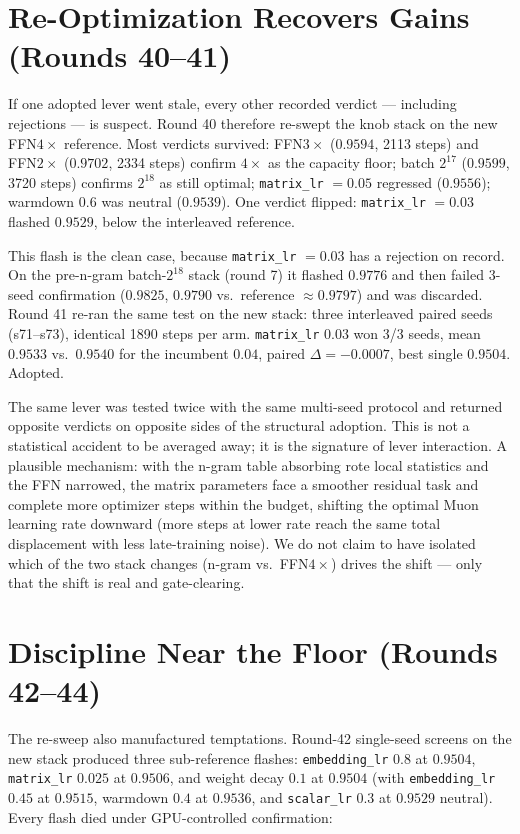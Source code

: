 \documentclass{article}
\begin{document}
\section{Re-Optimization Recovers Gains (Rounds 40--41)}
\label{sec:reopt}

If one adopted lever went stale, every other recorded verdict --- including rejections --- is suspect. Round 40 therefore re-swept the knob stack on the new FFN$4\times$ reference. Most verdicts survived: FFN$3\times$ ($0.9594$, 2113 steps) and FFN$2\times$ ($0.9702$, 2334 steps) confirm $4\times$ as the capacity floor; batch $2^{17}$ ($0.9599$, 3720 steps) confirms $2^{18}$ as still optimal; \texttt{matrix\_lr} $= 0.05$ regressed ($0.9556$); warmdown $0.6$ was neutral ($0.9539$). One verdict flipped: \texttt{matrix\_lr} $= 0.03$ flashed $0.9529$, below the interleaved reference.

This flash is the clean case, because \texttt{matrix\_lr} $= 0.03$ has a rejection on record. On the pre-n-gram batch-$2^{18}$ stack (round 7) it flashed $0.9776$ and then failed 3-seed confirmation ($0.9825$, $0.9790$ vs.\ reference $\approx 0.9797$) and was discarded. Round 41 re-ran the same test on the new stack: three interleaved paired seeds (s71--s73), identical 1890 steps per arm. \texttt{matrix\_lr} $0.03$ won 3/3 seeds, mean $0.9533$ vs.\ $0.9540$ for the incumbent $0.04$, paired $\Delta = -0.0007$, best single $0.9504$. Adopted.

The same lever was tested twice with the same multi-seed protocol and returned opposite verdicts on opposite sides of the structural adoption. This is not a statistical accident to be averaged away; it is the signature of lever interaction. A plausible mechanism: with the n-gram table absorbing rote local statistics and the FFN narrowed, the matrix parameters face a smoother residual task and complete more optimizer steps within the budget, shifting the optimal Muon learning rate downward (more steps at lower rate reach the same total displacement with less late-training noise). We do not claim to have isolated which of the two stack changes (n-gram vs.\ FFN$4\times$) drives the shift --- only that the shift is real and gate-clearing.

\section{Discipline Near the Floor (Rounds 42--44)}
\label{sec:discipline}

The re-sweep also manufactured temptations. Round-42 single-seed screens on the new stack produced three sub-reference flashes: \texttt{embedding\_lr} $0.8$ at $0.9504$, \texttt{matrix\_lr} $0.025$ at $0.9506$, and weight decay $0.1$ at $0.9504$ (with \texttt{embedding\_lr} $0.45$ at $0.9515$, warmdown $0.4$ at $0.9536$, and \texttt{scalar\_lr} $0.3$ at $0.9529$ neutral). Every flash died under GPU-controlled confirmation:
\end{document}
